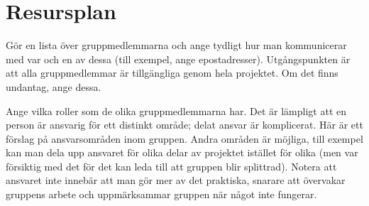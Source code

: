\documentclass[a4paper]{article}
\begin{document}
\section {Resursplan}
\label{sec:resurser}


Gör en lista över gruppmedlemmarna och ange tydligt hur man kommunicerar
med var och en av dessa (till exempel, ange epostadresser).
Utgångspunkten är att alla gruppmedlemmar är tillgängliga genom hela
projektet. Om det finns undantag, ange dessa.

Ange vilka roller som de olika gruppmedlemmarna har. Det är lämpligt att
en person är ansvarig för ett distinkt område; delat ansvar är
komplicerat. Här är ett förslag på ansvarsområden inom gruppen. Andra
områden är möjliga, till exempel kan man dela upp ansvaret för olika
delar av projektet istället för olika (men var försiktig med det för det
kan leda till att gruppen blir splittrad). Notera att ansvaret inte
innebär att man gör mer av det praktiska, snarare att övervakar gruppens
arbete och uppmärksammar gruppen när något inte fungerar.
\end{document}
